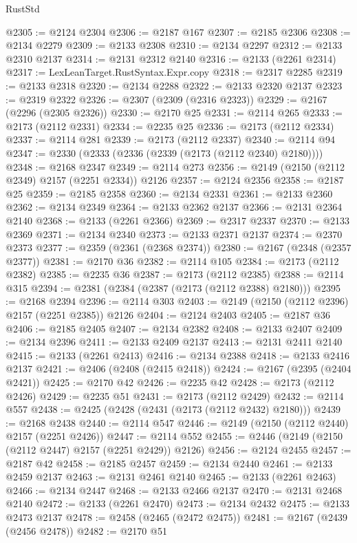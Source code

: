 \begin{lexlean}{RustStd}
\begin{coremodule}
@2305 := @2124 @2304
@2306 := @2187 @167
@2307 := @2185 @2306
@2308 := @2134 @2279
@2309 := @2133 @2308
@2310 := @2134 @2297
@2312 := @2133 @2310 @2137
@2314 := @2131 @2312 @2140
@2316 := @2133 (@2261 @2314)
@2317 := LexLeanTarget.RustSyntax.Expr.copy
@2318 := @2317 @2285
@2319 := @2133 @2318
@2320 := @2134 @2288
@2322 := @2133 @2320 @2137
@2323 := @2319 @2322
@2326 := @2307 (@2309 (@2316 @2323))
@2329 := @2167 (@2296 (@2305 @2326))
@2330 := @2170 @25
@2331 := @2114 @265
@2333 := @2173 (@2112 @2331)
@2334 := @2235 @25
@2336 := @2173 (@2112 @2334)
@2337 := @2114 @281
@2339 := @2173 (@2112 @2337)
@2340 := @2114 @94
@2347 := @2330 (@2333 (@2336 (@2339 (@2173 (@2112 @2340) @2180))))
@2348 := @2168 @2347
@2349 := @2114 @273
@2356 := @2149 (@2150 (@2112 @2349) @2157 (@2251 @2334)) @2126
@2357 := @2124 @2356
@2358 := @2187 @25
@2359 := @2185 @2358
@2360 := @2134 @2331
@2361 := @2133 @2360
@2362 := @2134 @2349
@2364 := @2133 @2362 @2137
@2366 := @2131 @2364 @2140
@2368 := @2133 (@2261 @2366)
@2369 := @2317 @2337
@2370 := @2133 @2369
@2371 := @2134 @2340
@2373 := @2133 @2371 @2137
@2374 := @2370 @2373
@2377 := @2359 (@2361 (@2368 @2374))
@2380 := @2167 (@2348 (@2357 @2377))
@2381 := @2170 @36
@2382 := @2114 @105
@2384 := @2173 (@2112 @2382)
@2385 := @2235 @36
@2387 := @2173 (@2112 @2385)
@2388 := @2114 @315
@2394 := @2381 (@2384 (@2387 (@2173 (@2112 @2388) @2180)))
@2395 := @2168 @2394
@2396 := @2114 @303
@2403 := @2149 (@2150 (@2112 @2396) @2157 (@2251 @2385)) @2126
@2404 := @2124 @2403
@2405 := @2187 @36
@2406 := @2185 @2405
@2407 := @2134 @2382
@2408 := @2133 @2407
@2409 := @2134 @2396
@2411 := @2133 @2409 @2137
@2413 := @2131 @2411 @2140
@2415 := @2133 (@2261 @2413)
@2416 := @2134 @2388
@2418 := @2133 @2416 @2137
@2421 := @2406 (@2408 (@2415 @2418))
@2424 := @2167 (@2395 (@2404 @2421))
@2425 := @2170 @42
@2426 := @2235 @42
@2428 := @2173 (@2112 @2426)
@2429 := @2235 @51
@2431 := @2173 (@2112 @2429)
@2432 := @2114 @557
@2438 := @2425 (@2428 (@2431 (@2173 (@2112 @2432) @2180)))
@2439 := @2168 @2438
@2440 := @2114 @547
@2446 := @2149 (@2150 (@2112 @2440) @2157 (@2251 @2426))
@2447 := @2114 @552
@2455 := @2446 (@2149 (@2150 (@2112 @2447) @2157 (@2251 @2429)) @2126)
@2456 := @2124 @2455
@2457 := @2187 @42
@2458 := @2185 @2457
@2459 := @2134 @2440
@2461 := @2133 @2459 @2137
@2463 := @2131 @2461 @2140
@2465 := @2133 (@2261 @2463)
@2466 := @2134 @2447
@2468 := @2133 @2466 @2137
@2470 := @2131 @2468 @2140
@2472 := @2133 (@2261 @2470)
@2473 := @2134 @2432
@2475 := @2133 @2473 @2137
@2478 := @2458 (@2465 (@2472 @2475))
@2481 := @2167 (@2439 (@2456 @2478))
@2482 := @2170 @51

\end{coremodule}
\end{lexlean}
